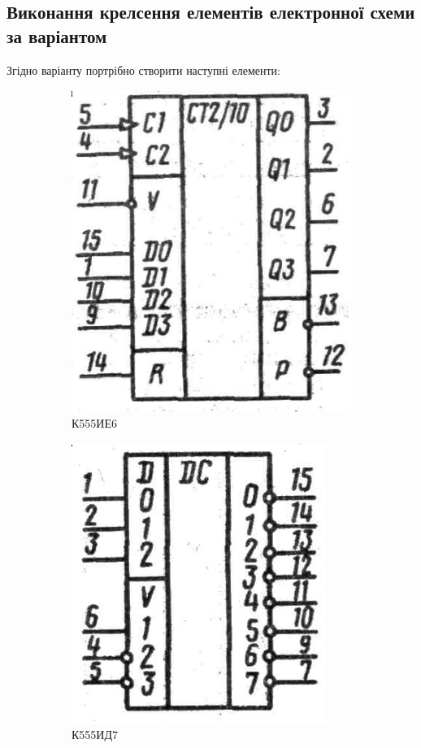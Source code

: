 \subsection{Виконання крелсення елементів електронної схеми за варіантом}

Згідно варіанту портрібно створити наступні елементи:
\begin{figure}[!htb]
  \begin{subfigure}[b]{.4\linewidth}
    \centering \includegraphics[width=.8\linewidth]{./images/lab2/target_element1.png}
    \caption{К555ИЕ6}
    \label{fig:lab2:target_element1}
  \end{subfigure}
  \hfill
  \begin{subfigure}[b]{.4\linewidth}
    \centering \includegraphics[width=.8\linewidth]{./images/lab2/target_element2.png}
    \caption{К555ИД7}
    \label{fig:lab2:target_element2}
  \end{subfigure}
  \caption{\label{fig:lab2:target_elements}}
\end{figure}
\FloatBarrier


